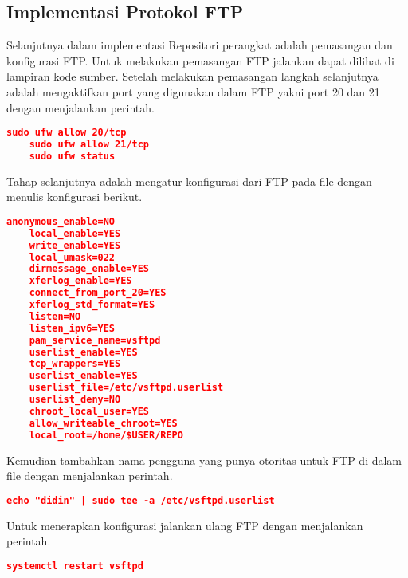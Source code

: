     \subsection{Implementasi Protokol FTP}
        Selanjutnya dalam implementasi Repositori perangkat adalah pemasangan dan konfigurasi FTP. Untuk melakukan pemasangan FTP jalankan dapat dilihat di lampiran kode sumber.
        Setelah melakukan pemasangan langkah selanjutnya adalah mengaktifkan port yang digunakan dalam FTP yakni port 20 dan 21 dengan menjalankan perintah.
    \begin{lstlisting}[frame=single,tabsize=2,breaklines,caption={Aktivasi port FTP},label=nonrootuser, captionpos=b, language=json,numbers=none]
    sudo ufw allow 20/tcp
    sudo ufw allow 21/tcp
    sudo ufw status
    \end{lstlisting}
        Tahap selanjutnya adalah mengatur konfigurasi dari FTP pada file  dengan menulis konfigurasi berikut.
    \begin{lstlisting}[frame=single,tabsize=2,breaklines,caption={Konfigurasi file FTP},label=nonrootuser, captionpos=b, language=json,numbers=none]
    anonymous_enable=NO
    local_enable=YES		
    write_enable=YES		
    local_umask=022		        
    dirmessage_enable=YES	        
    xferlog_enable=YES		
    connect_from_port_20=YES        
    xferlog_std_format=YES          
    listen=NO   			
    listen_ipv6=YES		        
    pam_service_name=vsftpd         
    userlist_enable=YES  	        
    tcp_wrappers=YES
    userlist_enable=YES                   
    userlist_file=/etc/vsftpd.userlist
    userlist_deny=NO
    chroot_local_user=YES
    allow_writeable_chroot=YES
    local_root=/home/$USER/REPO
    \end{lstlisting}
        Kemudian tambahkan nama pengguna yang punya otoritas untuk FTP di dalam file  dengan menjalankan perintah.
    \begin{lstlisting}[frame=single,tabsize=2,breaklines,caption={Pengguna FTP},label=nonrootuser, captionpos=b, language=json,numbers=none]
    echo "didin" | sudo tee -a /etc/vsftpd.userlist
    \end{lstlisting}
        Untuk menerapkan konfigurasi jalankan ulang FTP dengan menjalankan perintah.
    \begin{lstlisting}[frame=single,tabsize=2,breaklines,caption={Jalan ulang FTP},label=nonrootuser, captionpos=b, language=json,numbers=none]
    systemctl restart vsftpd
    \end{lstlisting}
        
